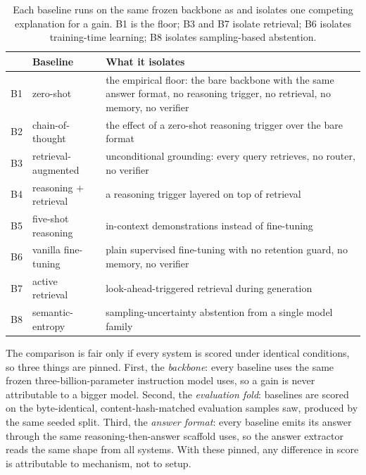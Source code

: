 \begin{table}[htbp]
\centering
\small
\begin{tabular}{@{}llp{6.6cm}@{}}
\toprule
 & \textbf{Baseline} & \textbf{What it isolates} \\
\midrule
B1 & zero-shot               & the empirical floor: the bare backbone with the same answer format, no reasoning trigger, no retrieval, no memory, no verifier \\
B2 & chain-of-thought        & the effect of a zero-shot reasoning trigger over the bare format~\cite{wei2022chain} \\
B3 & retrieval-augmented     & unconditional grounding: every query retrieves, no router, no verifier~\cite{karpukhin-etal-2020-dense} \\
B4 & reasoning $+$ retrieval & a reasoning trigger layered on top of retrieval \\
B5 & five-shot reasoning     & in-context demonstrations instead of fine-tuning~\cite{wei2022chain} \\
B6 & vanilla fine-tuning     & plain supervised fine-tuning with no retention guard, no memory, no verifier \\
B7 & active retrieval        & look-ahead-triggered retrieval during generation~\cite{jiang-etal-2023-active} \\
B8 & semantic-entropy        & sampling-uncertainty abstention from a single model family~\cite{farquhar2024semantic} \\
\bottomrule
\end{tabular}
\caption[The eight-baseline panel]{Each baseline runs on the same frozen backbone as
\caem{} and isolates one competing explanation for a gain. B1 is the floor; B3 and B7
isolate retrieval; B6 isolates training-time learning; B8 isolates sampling-based
abstention.}
\label{tab:baselines}
\end{table}

\begin{precise}
The comparison is fair only if every system is scored under identical conditions, so
three things are pinned. First, the \emph{backbone}: every baseline uses the same
frozen three-billion-parameter instruction model \caem{} uses, so a gain is never
attributable to a bigger model. Second, the \emph{evaluation fold}: baselines are
scored on the byte-identical, content-hash-matched evaluation samples \caem{} saw,
produced by the same seeded split. Third, the \emph{answer format}: every baseline
emits its answer through the same reasoning-then-answer scaffold \caem{} uses, so the
answer extractor reads the same shape from all systems. With these pinned, any
difference in score is attributable to mechanism, not to setup.
\end{precise}

